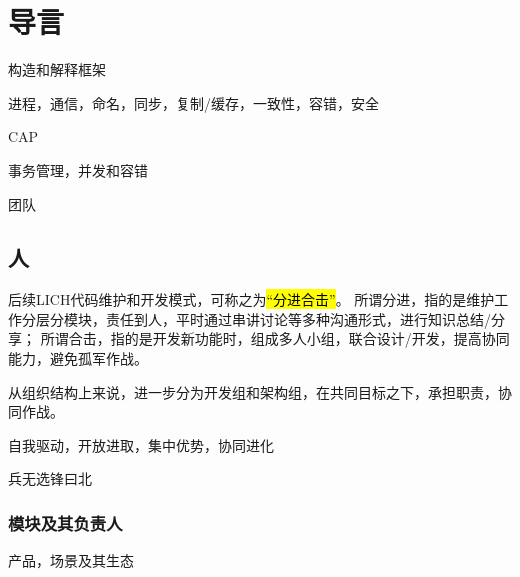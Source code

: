 \chapter{导言}

构造和解释框架

进程，通信，命名，同步，复制/缓存，一致性，容错，安全

CAP

事务管理，并发和容错

团队


\section{人}

后续LICH代码维护和开发模式，可称之为\hl{“分进合击”}。
所谓分进，指的是维护工作分层分模块，责任到人，平时通过串讲讨论等多种沟通形式，进行知识总结/分享；
所谓合击，指的是开发新功能时，组成多人小组，联合设计/开发，提高协同能力，避免孤军作战。

从组织结构上来说，进一步分为开发组和架构组，在共同目标之下，承担职责，协同作战。

自我驱动，开放进取，集中优势，协同进化

\begin{shadequote}
兵无选锋曰北
\end{shadequote}

\subsection{模块及其负责人}

产品，场景及其生态

